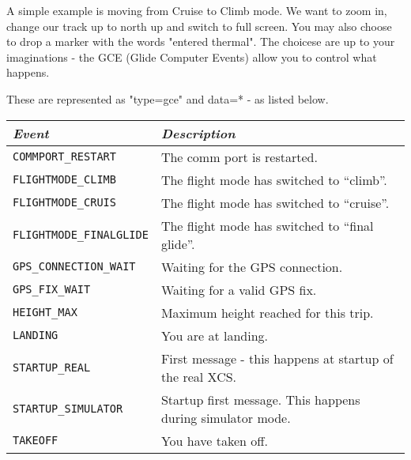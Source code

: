 A simple example is moving from Cruise to Climb mode. We want to zoom
in, change our track up to north up and switch to full screen. You may
also choose to drop a marker with the words "entered thermal". The
choicese are up to your imaginations - the GCE (Glide Computer Events)
allow you to control what happens.

These are represented as "type=gce" and data=* - as listed below.

{\footnotesize
\begin{tabular}{l|p{5.6cm}}
\emph{Event} & \emph{Description} \\
\hline

\verb|COMMPORT_RESTART| & The comm port is restarted. \\

\hline

\verb|FLIGHTMODE_CLIMB| & The flight mode has switched to ``climb''. \\

\hline

\verb|FLIGHTMODE_CRUIS| & The flight mode has switched to ``cruise''. \\

\hline

\verb|FLIGHTMODE_FINALGLIDE| & The flight mode has switched to ``final
glide''. \\

\hline

\verb|GPS_CONNECTION_WAIT| & Waiting for the GPS connection. \\

\hline

\verb|GPS_FIX_WAIT| & Waiting for a valid GPS fix. \\

\hline

\verb|HEIGHT_MAX| & Maximum height reached for this trip. \\

\hline

\verb|LANDING| & You are at landing. \\

\hline

\verb|STARTUP_REAL| & First message - this happens at startup of the
real XCS. \\

\hline

\verb|STARTUP_SIMULATOR| & Startup first message. This happens during
simulator mode. \\

\hline

\verb|TAKEOFF| & You have taken off. \\

\end{tabular}}
